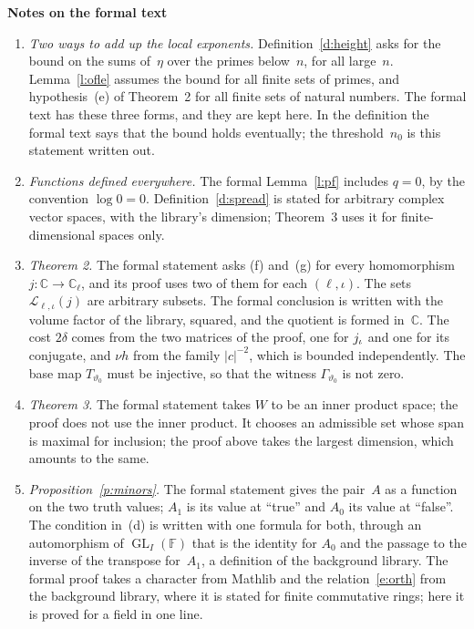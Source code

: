 \documentclass[11pt,a4paper]{article}
\newcommand{\F}{\mathbb{F}}
\newcommand{\m}[1]{\mbox{$#1$}}        %
\newcommand{\sect}[2]{\refstepcounter{section}\label{#2}\par\addvspace{19pt plus 4pt minus 2pt}\Needspace{7\baselineskip}%
  \noindent\llap{{\fontsize{13.2}{16}\selectfont\bfseries\color{inkfaint}\thesection}\hspace{9pt}}%
  {\fontsize{13.2}{16}\selectfont\bfseries\color{ink}#1}\par\nopagebreak\vspace{-1pt}}
\theoremstyle{plainx}
\theoremstyle{uprightx}
\newcommand{\CC}{\mathbb{C}}
\newcommand{\Cl}{\mathbb{C}_\ell}
\newcommand{\Ls}{\mathcal{L}}
\newcommand{\GL}{\operatorname{GL}}
\newcommand{\abs}[1]{\lvert #1\rvert}
\begin{document}
\sect{Notes on the formal text}{s:notes}
\begin{enumerate}[label=\textup{\arabic*.},leftmargin=1.6em,itemsep=5pt]
\item \emph{Two ways to add up the local exponents.} Definition~\ref{d:height} asks for the bound on the sums
of~$\eta$ over the primes below~$n$, for all large~$n$. Lemma~\ref{l:ofle} assumes the bound for all finite sets
of primes, and hypothesis~(e) of Theorem~2 for all finite sets of natural numbers. The formal text has these three
forms, and they are kept here. In the definition the formal text says that the bound holds eventually; the
threshold~$n_0$ is this statement written out.
\item \emph{Functions defined everywhere.} The formal Lemma~\ref{l:pf} includes \m{q=0}, by the convention
\m{\log0=0}. Definition~\ref{d:spread} is stated for arbitrary complex vector spaces, with the library's dimension;
Theorem~3 uses it for finite-dimensional spaces only.
\item \emph{Theorem 2.} The formal statement asks (f) and~(g) for every homomorphism \m{j\colon\CC\to\Cl}, and its
proof uses two of them for each $(\ell,\iota)$. The sets $\Ls_{\ell,\iota}(j)$ are arbitrary subsets. The formal
conclusion is written with the volume factor of the library, squared, and the quotient is formed in~$\CC$. The cost
$2\delta$ comes from the two matrices of the proof, one for $j_{\iota}$ and one for its conjugate, and
$\nu h$ from the family $\abs{c}^{-2}$, which is bounded independently. The base map $T_{\vartheta_0}$ must be
injective, so that the witness $\Gamma_{\vartheta_0}$ is not zero.
\item \emph{Theorem 3.} The formal statement takes $W$ to be an inner product space; the proof does not use the
inner product. It chooses an admissible set whose span is maximal for inclusion; the proof above takes the
largest dimension, which amounts to the same.
\item \emph{Proposition~\ref{p:minors}.} The formal statement gives the pair~$A$ as a function on the two truth
values; $A_1$ is its value at ``true'' and $A_0$ its value at ``false''. The condition in~(d) is written with one
formula for both, through an automorphism of $\GL_I(\F)$ that is the identity for $A_0$ and the passage to the
inverse of the transpose for~$A_1$, a definition of the background library. The formal proof takes a character
from Mathlib and the relation~\eqref{e:orth} from the background library, where it is stated for finite commutative
rings; here it is proved for a field in one line.

\end{enumerate}
\end{document}
